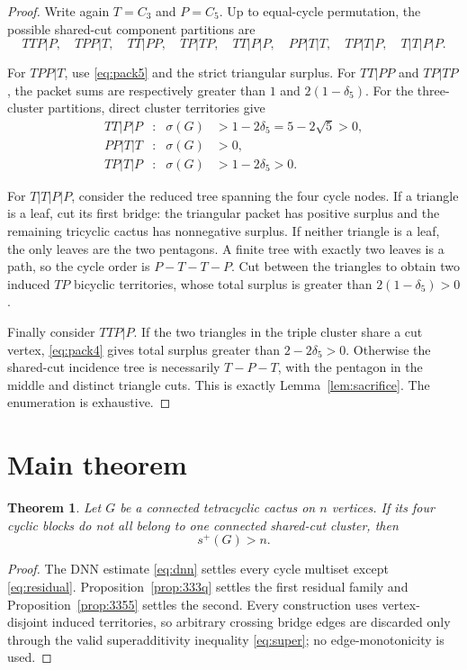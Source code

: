 \documentclass[11pt]{article}
\newtheorem{theorem}{Theorem}[section]
\newcommand{\spE}{s^+}
\newcommand{\sig}{\sigma}
\begin{document}
\begin{proof}
Write again $T=C_3$ and $P=C_5$.  Up to equal-cycle permutation, the possible
shared-cut component partitions are
\[
 TTP|P,\quad TPP|T,\quad TT|PP,\quad TP|TP,
 \quad TT|P|P,\quad PP|T|T,\quad TP|T|P,
 \quad T|T|P|P.
\]

For $TPP|T$, use \eqref{eq:pack5} and the strict triangular surplus.  For
$TT|PP$ and $TP|TP$, the packet sums are respectively greater than $1$ and
$2(1-\delta_5)$.  For the three-cluster partitions, direct cluster territories
give
\begin{align*}
 TT|P|P &: &\sig(G)&>1-2\delta_5=5-2\sqrt5>0,\\
 PP|T|T &: &\sig(G)&>0,\\
 TP|T|P &: &\sig(G)&>1-2\delta_5>0.
\end{align*}

For $T|T|P|P$, consider the reduced tree spanning the four cycle nodes.  If a
triangle is a leaf, cut its first bridge: the triangular packet has positive
surplus and the remaining tricyclic cactus has nonnegative surplus.  If neither
triangle is a leaf, the only leaves are the two pentagons.  A finite tree with
exactly two leaves is a path, so the cycle order is $P-T-T-P$.  Cut between the
triangles to obtain two induced $TP$ bicyclic territories, whose total surplus
is greater than $2(1-\delta_5)>0$.

Finally consider $TTP|P$.  If the two triangles in the triple cluster share a
cut vertex, \eqref{eq:pack4} gives total surplus greater than
$2-2\delta_5>0$.  Otherwise the shared-cut incidence tree is necessarily
$T-P-T$, with the pentagon in the middle and distinct triangle cuts.  This is
exactly Lemma~\ref{lem:sacrifice}.  The enumeration is exhaustive.
\end{proof}

\section{Main theorem}

\begin{theorem}\label{thm:main}
Let $G$ be a connected tetracyclic cactus on $n$ vertices.  If its four cyclic
blocks do not all belong to one connected shared-cut cluster, then
\[
 \boxed{\spE(G)>n}.
\]
\end{theorem}

\begin{proof}
The DNN estimate \eqref{eq:dnn} settles every cycle multiset except
\eqref{eq:residual}.  Proposition~\ref{prop:333q} settles the first residual
family and Proposition~\ref{prop:3355} settles the second.  Every construction
uses vertex-disjoint induced territories, so arbitrary crossing bridge edges
are discarded only through the valid superadditivity inequality
\eqref{eq:super}; no edge-monotonicity is used.
\end{proof}
\end{document}

